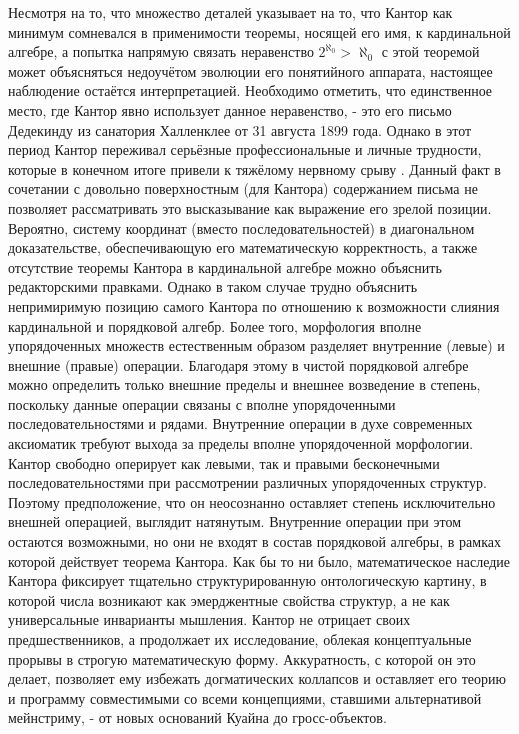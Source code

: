 \documentclass[12pt]{article}
\begin{document}
Несмотря на то, что множество деталей указывает на то, что Кантор как минимум сомневался в применимости теоремы, носящей его имя, к кардинальной алгебре, а попытка напрямую связать неравенство $2^{\aleph_0} > \aleph_0$ с этой теоремой может объясняться недоучётом эволюции его понятийного аппарата, настоящее наблюдение остаётся интерпретацией. Необходимо отметить, что единственное место, где Кантор явно использует данное неравенство, - это его письмо Дедекинду из санатория Халленклее от 31 августа 1899 года. Однако в этот период Кантор переживал серьёзные профессиональные и личные трудности, которые в конечном итоге привели к тяжёлому нервному срыву \cite{dauben-cantor-1899, grattan-guinness-1899}. Данный факт в сочетании с довольно поверхностным (для Кантора) содержанием письма не позволяет рассматривать это высказывание как выражение его зрелой позиции. Вероятно, систему координат (вместо последовательностей) в диагональном доказательстве, обеспечивающую его математическую корректность, а также отсутствие теоремы Кантора в кардинальной алгебре можно объяснить редакторскими правками. Однако в таком случае трудно объяснить непримиримую позицию самого Кантора по отношению к возможности слияния кардинальной и порядковой алгебр. Более того, морфология вполне упорядоченных множеств естественным образом разделяет внутренние (левые) и внешние (правые) операции. Благодаря этому в чистой порядковой алгебре можно определить только внешние пределы и внешнее возведение в степень, поскольку данные операции связаны с вполне упорядоченными последовательностями и рядами. Внутренние операции в духе современных аксиоматик требуют выхода за пределы вполне упорядоченной морфологии. Кантор свободно оперирует как левыми, так и правыми бесконечными последовательностями при рассмотрении различных упорядоченных структур. Поэтому предположение, что он неосознанно оставляет степень исключительно внешней операцией, выглядит натянутым. Внутренние операции при этом остаются возможными, но они не входят в состав порядковой алгебры, в рамках которой действует теорема Кантора. Как бы то ни было, математическое наследие Кантора фиксирует тщательно структурированную онтологическую картину, в которой числа возникают как эмерджентные свойства структур, а не как универсальные инварианты мышления. Кантор не отрицает своих предшественников, а продолжает их исследование, облекая концептуальные прорывы в строгую математическую форму. Аккуратность, с которой он это делает, позволяет ему избежать догматических коллапсов и оставляет его теорию и программу совместимыми со всеми концепциями, ставшими альтернативой мейнстриму, - от новых оснований Куайна до гросс-объектов.
\end{document}
